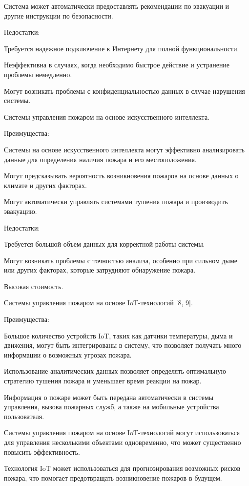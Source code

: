 \begin{multicols}{2}
Система может автоматически предоставлять рекомендации по эвакуации и
другие инструкции по безопасности.

Недостатки:

Требуется надежное подключение к Интернету для полной
функциональности.

Неэффективна в случаях, когда необходимо быстрое действие и устранение
проблемы немедленно.

Могут возникать проблемы с конфиденциальностью данных в случае
нарушения системы.

Системы управления пожаром на основе искусственного интеллекта.

Преимущества:

Системы на основе искусственного интеллекта могут эффективно
анализировать данные для определения наличия пожара и его
местоположения.

Могут предсказывать вероятность возникновения пожаров на основе данных
о климате и других факторах.

Могут автоматически управлять системами тушения пожара и производить
эвакуацию.

Недостатки:

Требуется большой объем данных для корректной работы системы.

Могут возникать проблемы с точностью анализа, особенно при сильном
дыме или других факторах, которые затрудняют обнаружение пожара.

Высокая стоимость.

Системы управления пожаром на основе IoT-технологий {[}8, 9{]}.

Преимущества:

Большое количество устройств IoT, таких как датчики температуры, дыма
и движения, могут быть интегрированы в систему, что позволяет получать
много информации о возможных угрозах пожара.

Использование аналитических данных позволяет определять оптимальную
стратегию тушения пожара и уменьшает время реакции на пожар.

Информация о пожаре может быть передана автоматически в системы
управления, вызова пожарных служб, а также на мобильные устройства
пользователя.

Системы управления пожаром на основе IoT-технологий могут
использоваться для управления несколькими объектами одновременно, что
может существенно повысить эффективность.

Технология IoT может использоваться для прогнозирования возможных
рисков пожара, что помогает предотвращать возникновение пожаров в
будущем.


\end{multicols}
